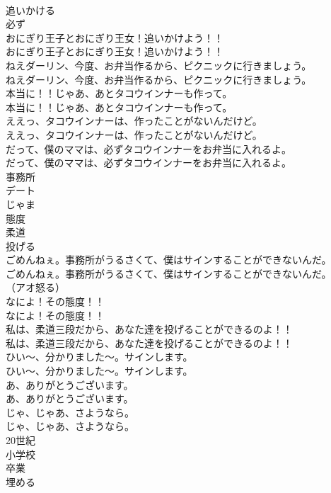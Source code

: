 \documentclass[8pt]{extreport}
\begin{document}
\begin{CJK}{UTF8}{min}
\\	追いかける
\\	必ず
\\	おにぎり王子とおにぎり王女！追いかけよう！！	
\\	おにぎり王子とおにぎり王女！追いかけよう！！ 
\\	ねえダーリン、今度、お弁当作るから、ピクニックに行きましょう。	
\\	ねえダーリン、今度、お弁当作るから、ピクニックに行きましょう。 
\\	本当に！！じゃあ、あとタコウインナーも作って。	
\\	本当に！！じゃあ、あとタコウインナーも作って。 
\\	ええっ、タコウインナーは、作ったことがないんだけど。	
\\	ええっ、タコウインナーは、作ったことがないんだけど。 
\\	だって、僕のママは、必ずタコウインナーをお弁当に入れるよ。	
\\	だって、僕のママは、必ずタコウインナーをお弁当に入れるよ。 
\\	事務所
\\	デート
\\	じゃま
\\	態度
\\	柔道
\\	投げる
\\	ごめんねぇ。事務所がうるさくて、僕はサインすることができないんだ。	
\\	ごめんねぇ。事務所がうるさくて、僕はサインすることができないんだ。 
\\	（アオ怒る）	
\\	なによ！その態度！！	
\\	なによ！その態度！！ 
\\	私は、柔道三段だから、あなた達を投げることができるのよ！！	
\\	私は、柔道三段だから、あなた達を投げることができるのよ！！ 
\\	ひい～、分かりました～。サインします。	
\\	ひい～、分かりました～。サインします。 
\\	あ、ありがとうございます。	
\\	あ、ありがとうございます。 
\\	じゃ、じゃあ、さようなら。	
\\	じゃ、じゃあ、さようなら。 
\\	20世紀
\\	小学校
\\	卒業
\\	埋める

\end{CJK}
\end{document}
